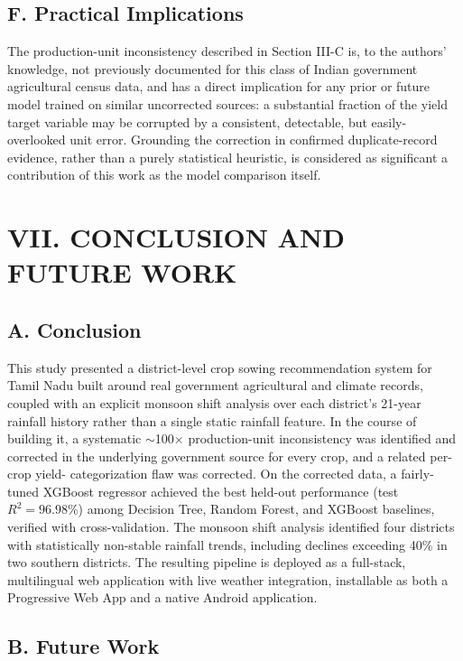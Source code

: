 \documentclass[12pt,a4paper,twocolumn]{article}
\begin{document}
\subsection*{F. Practical Implications}

The production-unit inconsistency described in Section III-C is, to the authors'
knowledge, not previously documented for this class of Indian government
agricultural census data, and has a direct implication for any prior or future model
trained on similar uncorrected sources: a substantial fraction of the yield target
variable may be corrupted by a consistent, detectable, but easily-overlooked unit
error. Grounding the correction in confirmed duplicate-record evidence, rather than a
purely statistical heuristic, is considered as significant a contribution of this
work as the model comparison itself.

\section*{VII. CONCLUSION AND FUTURE WORK}

\subsection*{A. Conclusion}

This study presented a district-level crop sowing recommendation system for Tamil
Nadu built around real government agricultural and climate records, coupled with an
explicit monsoon shift analysis over each district's 21-year rainfall history rather
than a single static rainfall feature. In the course of building it, a systematic
$\sim$100$\times$ production-unit inconsistency was identified and corrected in the
underlying government source for every crop, and a related per-crop yield-
categorization flaw was corrected. On the corrected data, a fairly-tuned XGBoost
regressor achieved the best held-out performance (test $R^2 = 96.98\%$) among
Decision Tree, Random Forest, and XGBoost baselines, verified with cross-validation.
The monsoon shift analysis identified four districts with statistically non-stable
rainfall trends, including declines exceeding 40\% in two southern districts. The
resulting pipeline is deployed as a full-stack, multilingual web application with
live weather integration, installable as both a Progressive Web App and a native
Android application.

\subsection*{B. Future Work}
\end{document}
